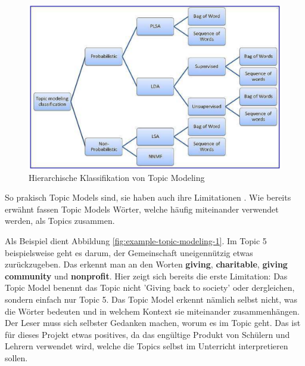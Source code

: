 \begin{figure}
    \centering
    \includegraphics[scale=0.26]{images/dlengsteiner/topic-modeling-hierarchy.png}
    \caption{Hierarchische Klassifikation von Topic Modeling}
    \label{fig:topic-modeling-hierarchy}
\end{figure}

\newpage

So prakisch Topic Models sind, sie haben auch ihre Limitationen \cite{sense-topic-modelling-van-kessel}. Wie bereits erwähnt fassen Topic Models Wörter, welche häufig miteinander verwendet werden, als Topics zusammen.

Als Beispiel dient Abbildung \ref{fig:example-topic-modeling-1}. Im Topic 5 beispielsweise geht es darum, der Gemeinschaft uneigennützig etwas zurückzugeben. Das erkennt man an den Worten \textbf{giving}, \textbf{charitable}, \textbf{giving community} und \textbf{nonprofit}. Hier zeigt sich bereits die erste Limitation: Das Topic Model benennt das Topic nicht 'Giving back to society' oder dergleichen, sondern einfach nur Topic 5. Das Topic Model erkennt nämlich selbst nicht, was die Wörter bedeuten und in welchem Kontext sie miteinander zusammenhängen. Der Leser muss sich selbster Gedanken machen, worum es im Topic geht. Das ist für dieses Projekt etwas positives, da das engültige Produkt von Schülern und Lehrern verwendet wird, welche die Topics selbst im Unterricht interpretieren sollen.

